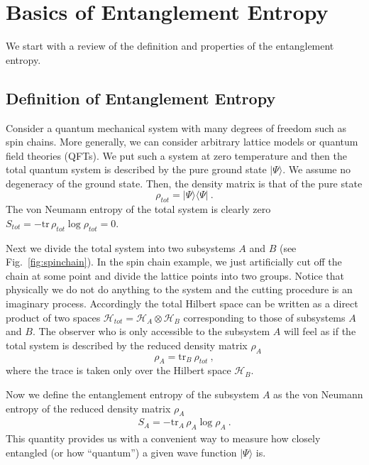 \documentclass[12pt]{article}
\def\lb{\rangle}
\def\be{\begin{equation}}
\def\ee{\end{equation}}
\begin{document}









\section{Basics of Entanglement Entropy}
\label{basics}
\setcounter{equation}{0}
\hspace{5mm}
We start with a review of the definition and properties of the entanglement entropy.

\subsection{Definition of Entanglement Entropy}
\label{def EE}
\hspace{5mm} Consider  a quantum mechanical system with many degrees
of freedom such as spin chains. More generally, we can consider
arbitrary lattice models or quantum field theories (QFTs).
We put such a system at zero temperature and
then the total quantum system is described by the
pure ground state $|\Psi\lb$. We assume no degeneracy of the ground state.
Then, the density
matrix is that of the pure state \be \rho_{tot}=|\Psi\rangle \langle
\Psi| \ . \label{pure}\ee The von Neumann entropy of the total system
is clearly zero $ S_{tot}= -\mathrm{tr}\, \rho_{tot} \log
\rho_{tot}=0$.

Next we divide the total system into two subsystems $A$ and $B$
(see Fig.\ \ref{fig:spinchain}). In
the spin chain example,
we just artificially cut off the chain at
some point and divide the lattice points into two groups. Notice
that physically we do not do anything to the system and the cutting
procedure is an imaginary process. Accordingly the total Hilbert
space can be written as a direct product of two spaces
${\mathcal{H}}_{tot}={\mathcal{H}}_{A}\otimes {\mathcal{H}}_{B}$
corresponding to those of subsystems $A$ and $B$.
The observer who is only accessible to the subsystem $A$ will feel as
if the total
system is described by the reduced density matrix $\rho_A$
\be
\rho_A= \mathrm{tr}_{B}~\rho_{tot}\ ,
\ee where the
trace is taken only over the Hilbert space ${\mathcal{H}}_{B}$.

Now we define the entanglement entropy of the
subsystem $A$ as
the von Neumann entropy of the reduced
density matrix $\rho_A$
\begin{eqnarray}
S_A =
- \mathrm{tr}_{A}\,
\rho_{A} \log \rho_{A}\ .
\label{eq:def entanglement entropy}
\end{eqnarray}
This quantity provides us with a convenient
way to measure how closely entangled (or how ``quantum'') a given
wave function $|\Psi\rangle$ is.
\end{document}
